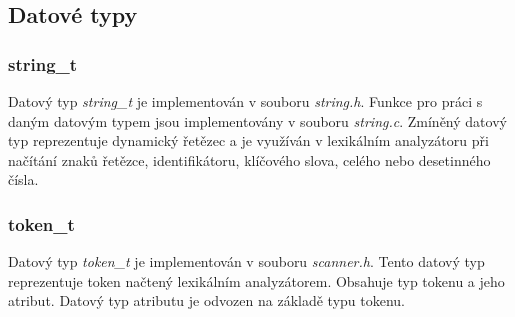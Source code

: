 \documentclass[a4paper, 12pt]{article}
\begin{document}
\subsection{Datové typy}
\subsubsection{string\_t}
Datový typ \textit{string\_t} je implementován v souboru \textit{string.h}. Funkce pro práci s daným datovým typem jsou implementovány v souboru \textit{string.c}. Zmíněný datový typ reprezentuje dynamický řetězec a je využíván v lexikálním analyzátoru při načítání znaků řetězce, identifikátoru, klíčového slova, celého nebo desetinného čísla.

\subsubsection{token\_t}
Datový typ \textit{token\_t} je implementován v souboru \textit{scanner.h}. Tento datový typ reprezentuje token načtený lexikálním analyzátorem. Obsahuje typ tokenu a jeho atribut. Datový typ atributu je odvozen na základě typu tokenu.

\newpage



\end{document}
